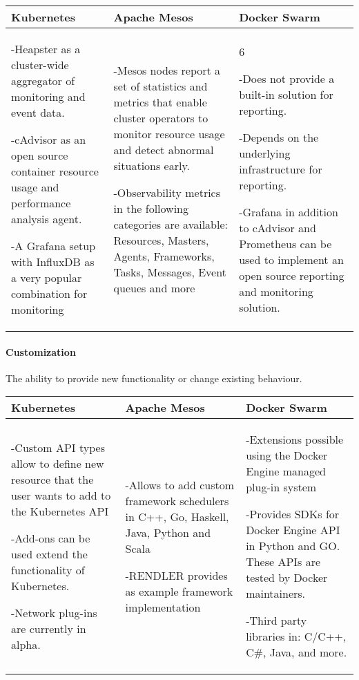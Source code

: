 \begin{center}
  \begin{tabular}{ | p{4.5cm} | p{4.5cm} | p{4.5cm} | }
    \hline
    \textbf{Kubernetes}&\textbf{Apache Mesos}&\textbf{Docker Swarm}\\\hline
    -Heapster as a cluster-wide aggregator of monitoring and event data.
    
    -cAdvisor as an open source container resource usage and performance
    analysis agent. 
    
    -A Grafana setup with InfluxDB as a very popular combination for monitoring&
    
    -Mesos nodes report a set of statistics and metrics that
    enable cluster operators to monitor resource usage and detect abnormal
    situations early.
    
    -Observability metrics in the following categories are available:
    Resources, Masters, Agents, Frameworks, Tasks, Messages, Event queues
    and more& 6
    
    -Does not provide a built-in solution for reporting.
    
    -Depends on the underlying infrastructure for reporting.
    
    -Grafana in addition to cAdvisor and Prometheus can be used to implement an
    open source reporting and monitoring solution.\\
    \hline
  \end{tabular}
\end{center}

\paragraph{Customization}

The ability to provide new functionality or change existing behaviour. 

\begin{center}
  \begin{tabular}{ | p{4.5cm} | p{4.5cm} | p{4.5cm} | }
    \hline
    \textbf{Kubernetes}&\textbf{Apache Mesos}&\textbf{Docker Swarm}\\\hline
    -Custom API types allow to define new resource that the user wants to add to
    the Kubernetes API 
    
    -Add-ons can be used extend the functionality of Kubernetes.
    
    -Network plug-ins are currently in alpha.& 
    
    -Allows to add custom framework schedulers in C++, Go, Haskell, Java, Python
    and Scala
    
    -RENDLER provides as example framework implementation & 
    
    -Extensions possible using the Docker Engine managed plug-in system
    
    -Provides SDKs for Docker Engine API in Python and GO. These APIs are tested
    by Docker maintainers.
    
    -Third party libraries in: C/C++, C\#, Java, and more.\\
    \hline
  \end{tabular}
\end{center}

